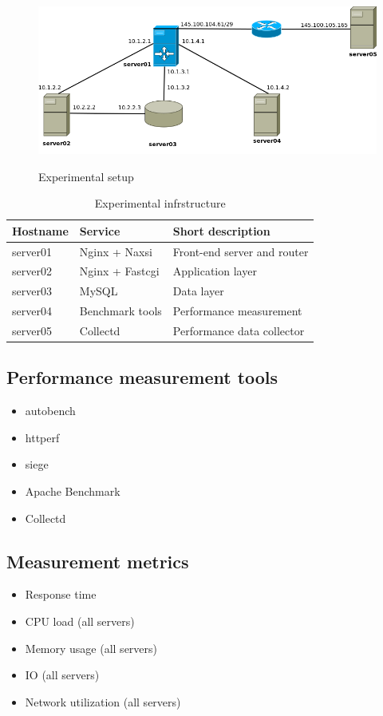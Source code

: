 \documentclass[Methods]{subfiles}
\begin{document}
\begin{figure}[h]
\caption{Experimental setup}
\centering
\includegraphics[scale=0.4] {images/infrastructure.png}
\label{fig:Experimental setup}
\end{figure}

\begin{table}[h]
\caption{Experimental infrstructure}
\begin{tabular}{|p{}|p{}|p{5cm}|}
\hline
\textbf{Hostname} & \textbf{Service} & \textbf{Short description} \\ \hline
server01 & Nginx + Naxsi & Front-end server and router \\ \hline
server02 & Nginx + Fastcgi & Application layer \\ \hline
server03 & MySQL & Data layer \\ \hline
server04 & Benchmark tools & Performance measurement \\ \hline
server05 & Collectd & Performance data collector \\ \hline
\end{tabular}
\label{tab:Experimental infrastructure}
\end{table}

\subsection{Performance measurement tools}
\begin{itemize}
\item autobench
\item httperf
\item siege
\item Apache Benchmark
\item Collectd
\end{itemize}

\subsection{Measurement metrics}
\begin{itemize}
\item Response time
\item CPU load (all servers)
\item Memory usage (all servers)
\item IO (all servers)
\item Network utilization (all servers)
\end{itemize}
\end{document}
